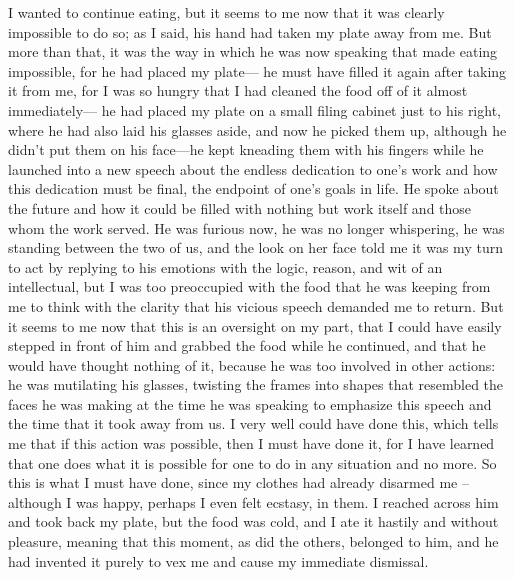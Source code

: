\documentclass[
]{memoir}
\begin{document}
I wanted to continue eating, but it seems to me now that it was clearly
impossible to do so; as I said, his hand had taken my plate away from
me. But more than that, it was the way in which he was now speaking that
made eating impossible, for he had placed my plate--- he must have
filled it again after taking it from me, for I was so hungry that I had
cleaned the food off of it almost immediately--- he had placed my plate
on a small filing cabinet just to his right, where he had also laid his
glasses aside, and now he picked them up, although he didn't put them on
his face---he kept kneading them with his fingers while he launched into
a new speech about the endless dedication to one's work and how this
dedication must be final, the endpoint of one's goals in life. He spoke
about the future and how it could be filled with nothing but work itself
and those whom the work served. He was furious now, he was no longer
whispering, he was standing between the two of us, and the look on her
face told me it was my turn to act by replying to his emotions with the
logic, reason, and wit of an intellectual, but I was too preoccupied
with the food that he was keeping from me to think with the clarity that
his vicious speech demanded me to return. But it seems to me now that
this is an oversight on my part, that I could have easily stepped in
front of him and grabbed the food while he continued, and that he would
have thought nothing of it, because he was too involved in other
actions: he was mutilating his glasses, twisting the frames into shapes
that resembled the faces he was making at the time he was speaking to
emphasize this speech and the time that it took away from us. I very
well could have done this, which tells me that if this action was
possible, then I must have done it, for I have learned that one does
what it is possible for one to do in any situation and no more. So this
is what I must have done, since my clothes had already disarmed me --
although I was happy, perhaps I even felt ecstasy, in them. I reached
across him and took back my plate, but the food was cold, and I ate it
hastily and without pleasure, meaning that this moment, as did the
others, belonged to him, and he had invented it purely to vex me and
cause my immediate dismissal.
\end{document}
